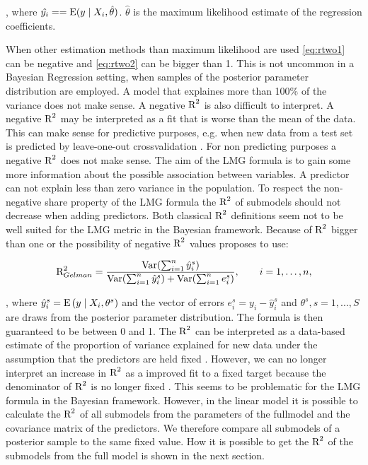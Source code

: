 \documentclass[11pt,a4paper,twoside]{book}\usepackage[]{graphicx}\usepackage[]{color}
\begin{document}
, where $\hat{y_{i}} = = \operatorname{E} ({y \mid X_{i}, \hat{\theta}})$.  $\hat{\theta}$ is the maximum likelihood estimate of the regression coefficients.


When other estimation methods than maximum likelihood are used \eqref{eq:rtwo1} can be negative and \eqref{eq:rtwo2}  can be bigger than 1. This is not uncommon in a Bayesian Regression setting, when samples of the posterior parameter distribution are employed. A model that explaines more than 100\% of the variance does not make sense. A negative $\text{R}^2$ is also difficult to interpret. A negative $\text{R}^2$ may be interpreted as a fit that is worse than the mean of the data. This can make sense for predictive purposes, e.g. when new data from a test set is predicted by leave-one-out crossvalidation \citep{Alexander2015}.  For non predicting purposes a negative $\text{R}^2$ does not make sense. The aim of the LMG formula is to gain some more information about the possible association between variables. A predictor can not explain less than zero variance in the population. To respect the non-negative share property of the LMG formula the $\text{R}^2$ of submodels should not decrease when adding predictors. Both classical $\text{R}^2$ definitions seem not to be well suited for the LMG metric in the Bayesian framework. Because of $\text{R}^2$ bigger than one or the possibility of negative $\text{R}^2$ values \cite{Gelman2017} proposes to use:

      \begin{align} 
       \text{R}^2_{Gelman} = \frac{\operatorname{Var}(\sum_{i=1}^{n}\hat{y}^s_{i})}{\operatorname{Var}(\sum_{i=1}^{n}\hat{y}^s_{i})+\operatorname{Var}(\sum_{i=1}^{n}e^s_{i})}, \qquad i = 1,\dots,n, \label{rtwoGelman} 
   \end{align} 
   
, where $\hat{y}^s_{i}  = \operatorname{E} \left({y \mid X_{i}, \theta^s}\right) $ and the vector of errors $e^s_{i} = y_{i} - \hat{y}^s_{i}$ and $\theta^s, s = 1, ... , S$ are draws from the posterior parameter distribution. The formula is then guaranteed to be between 0 and 1. The $\text{R}^2$ can  be interpreted as a data-based estimate of the proportion of variance explained for new data under the assumption that the predictors are held fixed \citep{Gelman2017}.  However, we can no longer interpret an increase in $\text{R}^2$ as a improved fit to a fixed target because the denominator of $\text{R}^2$ is no longer fixed . This seems to be problematic for the LMG formula in the Bayesian framework. However, in the linear model it is possible to calculate the $\text{R}^2$ of all submodels from the parameters of the fullmodel and the covariance matrix of the predictors. We therefore compare all submodels of a posterior sample to the same fixed value. How it is possible to get the $\text{R}^2$ of the submodels from the full model is shown in the next section.
\end{document}
